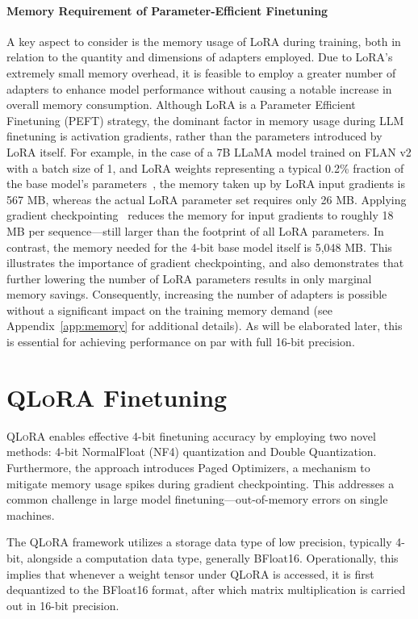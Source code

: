 \paragraph{Memory Requirement of Parameter-Efficient Finetuning} A key aspect to consider is the memory usage of LoRA during training, both in relation to the quantity and dimensions of adapters employed. Due to LoRA's extremely small memory overhead, it is feasible to employ a greater number of adapters to enhance model performance without causing a notable increase in overall memory consumption. Although LoRA is a Parameter Efficient Finetuning (PEFT) strategy, the dominant factor in memory usage during LLM finetuning is activation gradients, rather than the parameters introduced by LoRA itself. For example, in the case of a 7B LLaMA model trained on FLAN v2 with a batch size of 1, and LoRA weights representing a typical 0.2\% fraction of the base model’s parameters~\citep{hu2021lora,liu2022few}, the memory taken up by LoRA input gradients is 567 MB, whereas the actual LoRA parameter set requires only 26 MB. Applying gradient checkpointing~\citep{chen2016training} reduces the memory for input gradients to roughly 18 MB per sequence—still larger than the footprint of all LoRA parameters. In contrast, the memory needed for the 4-bit base model itself is 5,048 MB. This illustrates the importance of gradient checkpointing, and also demonstrates that further lowering the number of LoRA parameters results in only marginal memory savings. Consequently, increasing the number of adapters is possible without a significant impact on the training memory demand (see Appendix~\ref{app:memory} for additional details). As will be elaborated later, this is essential for achieving performance on par with full 16-bit precision.

\section{\textsc{QLoRA} Finetuning}

\textsc{QLoRA} enables effective 4-bit finetuning accuracy by employing two novel methods: 4-bit NormalFloat (NF4) quantization and Double Quantization. Furthermore, the approach introduces Paged Optimizers, a mechanism to mitigate memory usage spikes during gradient checkpointing. This addresses a common challenge in large model finetuning—out-of-memory errors on single machines.

The \textsc{QLoRA} framework utilizes a storage data type of low precision, typically 4-bit, alongside a computation data type, generally BFloat16. Operationally, this implies that whenever a weight tensor under \textsc{QLoRA} is accessed, it is first dequantized to the BFloat16 format, after which matrix multiplication is carried out in 16-bit precision.


